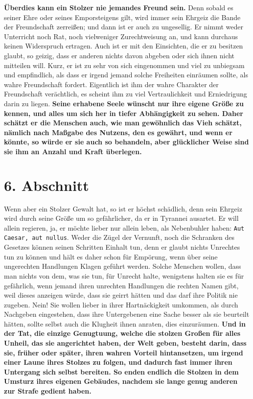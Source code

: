 \label{ref:12_05_eitle_menschen_freundschaft}
\textbf{Überdies kann ein Stolzer nie jemandes Freund sein.} Denn sobald es
seiner
Ehre
oder seines Emporsteigens gilt, wird immer sein Ehrgeiz die Bande der
Freundschaft
zerreißen; und dann ist er auch zu ungesellig. Er nimmt weder Unterricht noch
Rat, noch vielweniger Zurechtweisung an, und kann
durchaus keinen Widerspruch
ertragen. Auch ist er mit den Einsichten, die er zu besitzen glaubt, so geizig,
dass er anderen nichts davon abgeben oder sich ihnen nicht mitteilen will.
Kurz, er ist zu sehr von sich eingenommen und viel zu unbiegsam und empfindlich,
als dass er irgend jemand solche Freiheiten einräumen sollte, als wahre
Freundschaft fordert. Eigentlich ist ihm der wahre Charakter der Freundschaft
verächtlich, es scheint ihm zu viel Vertraulichkeit und Erniedrigung darin zu
liegen. \textbf{Seine erhabene Seele wünscht nur ihre eigene Größe zu kennen,
und alles
um sich her in tiefer Abhängigkeit zu sehen. Daher schätzt er die Menschen auch,
wie man gewöhnlich das Vieh schätzt, nämlich nach Maßgabe des Nutzens, den es
gewährt, und wenn er könnte, so würde er sie auch so behandeln, aber glücklicher
Weise sind sie ihm an Anzahl und Kraft überlegen.}

\section{6. Abschnitt} \label{kap12_ab6}

Wenn aber ein Stolzer Gewalt hat, so ist er höchst
schädlich, denn sein Ehrgeiz
wird durch seine Größe um so gefährlicher, da er in Tyrannei
ausartet. Er will
allein regieren, ja, er möchte lieber nur allein leben, als Nebenbuhler haben:
\texttt{Aut Caesar, aut nullus}. Weder die Zügel der Vernunft, noch die
Schranken des
Gesetzes können seinen Schritten Einhalt tun, denn er glaubt nichts Unrechtes
tun zu können und hält es daher schon für Empörung, wenn über seine ungerechten
Handlungen Klagen geführt werden. Solche Menschen wollen, dass man nichts von
dem, was sie tun, für Unrecht halte, wenigstens halten sie es für gefährlich,
wenn jemand ihren unrechten Handlungen die rechten Namen gibt, weil dieses
anzeigen würde, dass sie geirrt hätten und das darf ihre Politik nie zugeben.
Nein! Sie wollen lieber in ihrer Hartnäckigkeit umkommen, als durch Nachgeben
eingestehen, dass ihre Untergebenen eine Sache besser als sie beurteilt hätten,
sollte selbst auch die Klugheit ihnen anraten, dies einzuräumen.
\label{ref:12_06_eitle_menschen_sturz}
\textbf{Und in der
Tat, die einzige Genugtuung, welche die stolzen Großen für alles Unheil, das
sie angerichtet haben, der Welt geben, besteht darin, dass sie, früher oder
später, ihren wahren Vorteil hintansetzen, um irgend einer Laune ihres Stolzes
zu folgen, und dadurch fast immer ihren Untergang sich selbst bereiten. So enden
endlich die Stolzen in dem Umsturz ihres eigenen Gebäudes, nachdem sie lange
genug anderen zur Strafe gedient haben.}

